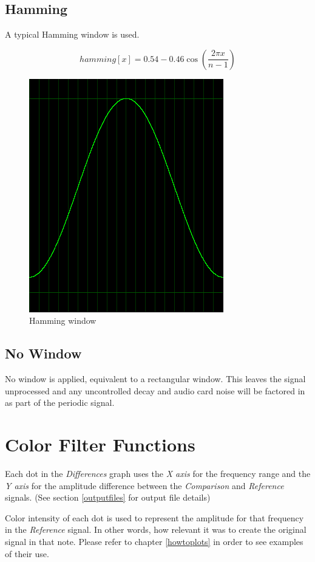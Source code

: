 \documentclass[10pt,a4paper]{report}
\begin{document}
\subsection{Hamming}
A typical Hamming window is used.

\begin{equation}
hamming[x] = 0.54 - 0.46\cos(\frac{2\pi x}{n-1})
\end{equation}

\begin{figure}[H]
	\centering
	\includegraphics[width=0.4\linewidth]{plots/window-hamming.png}
	\caption[Hamming window]{Hamming window}
	\label{fig:window-hamming}
\end{figure}


\subsection{No Window}

No window is applied, equivalent to a rectangular window. This leaves the signal unprocessed and any uncontrolled decay and audio card noise will be factored in as part of the periodic signal.


\section{Color Filter Functions}
\label{colorfilter}

Each dot in the \textit{Differences} graph uses the \textit{X axis} for the frequency range and the \textit{Y axis} for the amplitude difference between the \textit{Comparison} and \textit{Reference} signals. (See section \ref{outputfiles} for output file details)

Color intensity of each dot is used to represent the amplitude for that frequency in the \textit{Reference} signal. In other words, how relevant it was to create the original signal in that note. Please refer to chapter \ref{howtoplots} in order to see examples of their use.
\end{document}
